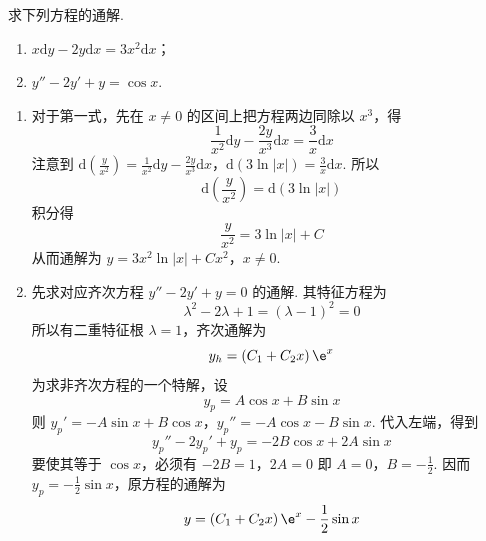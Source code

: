 \begin{problem}
求下列方程的通解.

\begin{enumerate}
\item \(x\mathrm{d}y-2y\mathrm{d}x=3x^2\mathrm{d}x\)；
\item \(y''-2y'+y=\cos x\).
\end{enumerate}
\end{problem}

\begin{solution}
\begin{enumerate}
\item 对于第一式，先在 \(x\ne0\) 的区间上把方程两边同除以 \(x^3\)，得
\[
\frac{1}{x^2}\mathrm{d}y-\frac{2y}{x^3}\mathrm{d}x=\frac{3}{x}\mathrm{d}x
\]
注意到
\(\mathrm{d}\left(\frac{y}{x^2}\right)=\frac{1}{x^2}\mathrm{d}y-\frac{2y}{x^3}\mathrm{d}x\)，\(\mathrm{d}\left(3\ln|x|\right)=\frac{3}{x}\mathrm{d}x\).
所以
\[
\mathrm{d}\left(\frac{y}{x^2}\right)=\mathrm{d}\left(3\ln|x|\right)
\]
积分得
\[
\frac{y}{x^2}=3\ln|x|+C
\]
从而通解为
\(y=3x^2\ln|x|+Cx^2\)，\(x\ne0\).

\item 先求对应齐次方程
\(y''-2y'+y=0\) 的通解. 其特征方程为
\[
\lambda^2-2\lambda+1=(\lambda-1)^2=0
\]
所以有二重特征根 \(\lambda=1\)，齐次通解为
\[
y_h=\left(C_1+C_2x\right)\e^x
\]
为求非齐次方程的一个特解，设
\[
y_p=A\cos x+B\sin x
\]
则
\(y_p'=-A\sin x+B\cos x\)，\(y_p''=-A\cos x-B\sin x\).
代入左端，得到
\[
y_p''-2y_p'+y_p=-2B\cos x+2A\sin x
\]
要使其等于 \(\cos x\)，必须有
\(-2B=1\)，\(2A=0\)
即 \(A=0\)，\(B=-\frac12\). 因而
\(y_p=-\frac12\sin x\)，原方程的通解为
\[
y=\left(C_1+C_2x\right)\e^x-\frac12\sin x
\]
\end{enumerate}
\end{solution}
